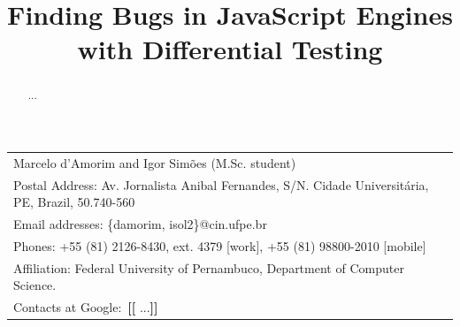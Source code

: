 \documentclass[11pt]{article}
\newcommand{\Fix}[1]{\textbf{[[}{\color{red} #1}\textbf{]]}}
\begin{document}
\title{Finding Bugs in JavaScript Engines with Differential Testing}
\author{}
\date{}


\makeatletter
\def\maketitle{%
  \par{\centering\large\textbf{\@title}\normalsize\par}\vspace{3ex}%
  \par{\@author}%
  \par}
\makeatother

\maketitle

\vspace{-2ex}
\small    
\begin{table}[h!] 
  \centering%
  \begin{tabular*}{.85\linewidth}{l}

    Marcelo d'Amorim and Igor Sim\~oes (M.Sc. student)\\
    
    Postal Address: Av. Jornalista Anibal Fernandes, S/N. Cidade
    Universit\'aria, PE, Brazil, 50.740-560 \\
    
    Email addresses: \{damorim, isol2\}@cin.ufpe.br\\

    Phones: +55 (81) 2126-8430,
    ext. 4379 [work], +55 (81) 98800-2010 [mobile]\\

    Affiliation: Federal University of Pernambuco, Department of
    Computer Science.\\

    Contacts at Google:~\Fix{...}

  \end{tabular*}
\end{table}
\normalsize

\vspace{-2ex}
\begin{abstract}
...
\end{abstract}
\end{document}
